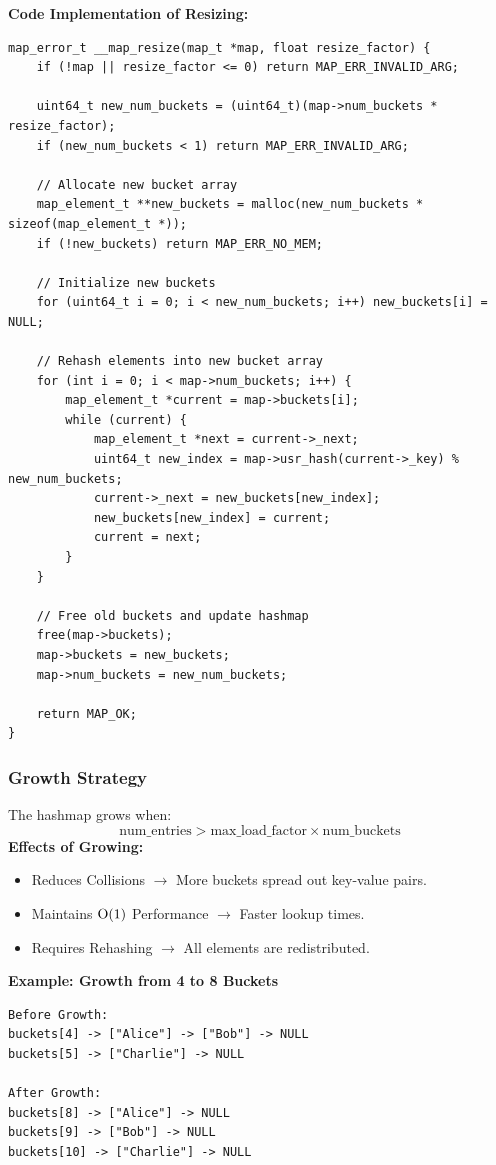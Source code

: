 \documentclass[titlepage]{article}
\begin{document}
\textbf{Code Implementation of Resizing:}
\begin{verbatim}
map_error_t __map_resize(map_t *map, float resize_factor) {
    if (!map || resize_factor <= 0) return MAP_ERR_INVALID_ARG;

    uint64_t new_num_buckets = (uint64_t)(map->num_buckets * resize_factor);
    if (new_num_buckets < 1) return MAP_ERR_INVALID_ARG;

    // Allocate new bucket array
    map_element_t **new_buckets = malloc(new_num_buckets * sizeof(map_element_t *));
    if (!new_buckets) return MAP_ERR_NO_MEM;

    // Initialize new buckets
    for (uint64_t i = 0; i < new_num_buckets; i++) new_buckets[i] = NULL;

    // Rehash elements into new bucket array
    for (int i = 0; i < map->num_buckets; i++) {
        map_element_t *current = map->buckets[i];
        while (current) {
            map_element_t *next = current->_next;
            uint64_t new_index = map->usr_hash(current->_key) % new_num_buckets;
            current->_next = new_buckets[new_index];
            new_buckets[new_index] = current;
            current = next;
        }
    }

    // Free old buckets and update hashmap
    free(map->buckets);
    map->buckets = new_buckets;
    map->num_buckets = new_num_buckets;

    return MAP_OK;
}
\end{verbatim}

\subsubsection{Growth Strategy}
The hashmap grows when:
\[
\text{num\_entries} > \text{max\_load\_factor} \times \text{num\_buckets}
\]
\textbf{Effects of Growing:}
\begin{itemize}
    \item Reduces Collisions $\rightarrow$ More buckets spread out key-value pairs.
    \item Maintains \( $O(1)$ \) Performance $\rightarrow$ Faster lookup times.
    \item Requires Rehashing $\rightarrow$ All elements are redistributed.
\end{itemize}

\textbf{Example: Growth from 4 to 8 Buckets}
\begin{verbatim}
Before Growth:
buckets[4] -> ["Alice"] -> ["Bob"] -> NULL
buckets[5] -> ["Charlie"] -> NULL

After Growth:
buckets[8] -> ["Alice"] -> NULL
buckets[9] -> ["Bob"] -> NULL
buckets[10] -> ["Charlie"] -> NULL
\end{verbatim}
\end{document}
